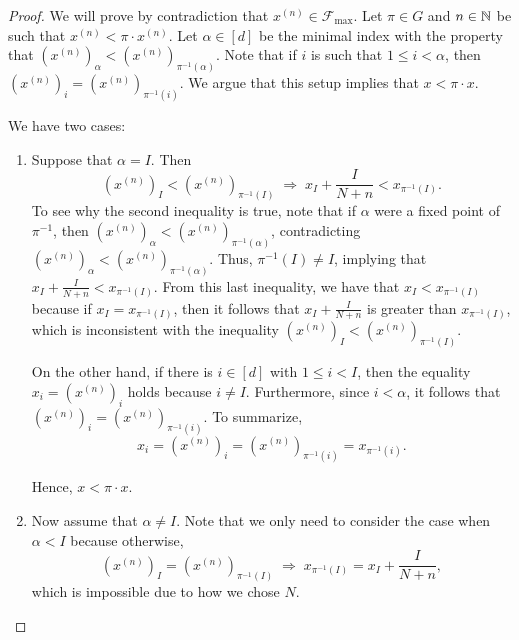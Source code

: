 \begin{proof}
We will prove by contradiction that $x^{(n)} \in \mathcal{F}_{\max}$. Let $\pi \in G$ and $n\in\mathbb{N}$ be such that $x^{(n)} < \pi \cdot x^{(n)}$. Let $\alpha \in [d]$ be the minimal index with the property that $(x^{(n)})_\alpha < (x^{(n)})_{\pi^{-1}(\alpha)}$. Note that if $i$ is such that $1 \le i < \alpha$, then $(x^{(n)})_i = (x^{(n)})_{\pi^{-1}(i)}$. We argue that this setup implies that $x < \pi \cdot x$.

We have two cases:

\begin{enumerate}
\item Suppose that $\alpha = I$. Then \[(x^{(n)})_I < (x^{(n)})_{\pi^{-1}(I)} \; \Longrightarrow \; x_I + \frac{I}{N + n} < x_{\pi^{-1}(I)}.\] To see why the second inequality is true, note that if $\alpha$ were a fixed point of $\pi^{-1}$, then $(x^{(n)})_\alpha < (x^{(n)})_{\pi^{-1}(\alpha)}$, contradicting $(x^{(n)})_\alpha < (x^{(n)})_{\pi^{-1}(\alpha)}$. Thus, $\pi^{-1}(I) \neq I$, implying that $x_I + \frac{I}{N + n} < x_{\pi^{-1}(I)}$.  From this last inequality, we have that $x_I < x_{\pi^{-1}(I)}$ because if $x_I = x_{\pi^{-1}(I)}$, then it follows that $x_I + \frac{I}{N + n}$ is greater than $x_{\pi^{-1}(I)}$, which is inconsistent with the inequality $(x^{(n)})_I < (x^{(n)})_{\pi^{-1}(I)}$.

    On the other hand, if there is $i\in[d]$ with $1 \le i < I$, then the equality $x_i = (x^{(n)})_i$ holds because $i\neq I$. Furthermore, since $i < \alpha$, it follows that $(x^{(n)})_i = (x^{(n)})_{\pi^{-1}(i)}$. To summarize, \[x_i = (x^{(n)})_i = (x^{(n)})_{\pi^{-1}(i)} = x_{\pi^{-1}(i)}.\]

    Hence, $x < \pi \cdot x$.
\item Now assume that $\alpha \neq I$. Note that we only need to consider the case when $\alpha < I$ because otherwise,  \[(x^{(n)})_I = (x^{(n)})_{\pi^{-1}(I)} \; \Longrightarrow \; x_{\pi^{-1}(I)} = x_I + \frac{I}{N + n},\] which is impossible due to how we chose $N$.


\end{enumerate}
\end{proof}
